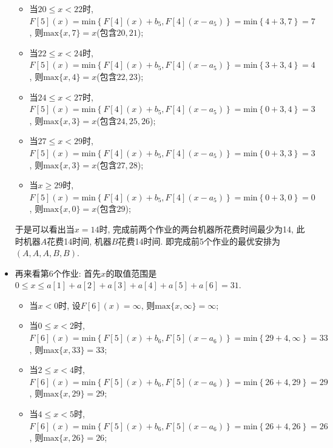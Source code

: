 \documentclass{article}
\begin{document}
\begin{homeworkProblem}
\begin{itemize}
\begin{itemize}
			\item 当$20\leq x<22$时, $F\left[ 5 \right] \left( x \right) =\text{min} \left\{ F\left[ 4 \right] \left( x \right) +b_5,F\left[ 4 \right] \left( x-a_5 \right) \right\} =\text{min} \left\{ 4+3,7 \right\} =7$, 则$\text{max}\{x,7\}=x$(包含$20,21$);
			\item 当$22\leq x<24$时, $F\left[ 5 \right] \left( x \right) =\text{min} \left\{ F\left[ 4 \right] \left( x \right) +b_5,F\left[ 4 \right] \left( x-a_5 \right) \right\} =\text{min} \left\{ 3+3,4 \right\} =4$, 则$\text{max}\{x,4\}=x$(包含$22,23$);
			\item 当$24\leq x<27$时, $F\left[ 5 \right] \left( x \right) =\text{min} \left\{ F\left[ 4 \right] \left( x \right) +b_5,F\left[ 4 \right] \left( x-a_5 \right) \right\} =\text{min} \left\{ 0+3,4 \right\} =3$, 则$\text{max}\{x,3\}=x$(包含$24,25,26$);
			\item 当$27\leq x<29$时, $F\left[ 5 \right] \left( x \right) =\text{min} \left\{ F\left[ 4 \right] \left( x \right) +b_5,F\left[ 4 \right] \left( x-a_5 \right) \right\} =\text{min} \left\{ 0+3,3 \right\} =3$, 则$\text{max}\{x,3\}=x$(包含$27,28$);
			\item 当$x\geq 29$时, $F\left[ 5 \right] \left( x \right) =\text{min} \left\{ F\left[ 4 \right] \left( x \right) +b_5,F\left[ 4 \right] \left( x-a_5 \right) \right\} =\text{min} \left\{ 0+3,0 \right\} =0$, 则$\text{max}\{x,0\}=x$(包含$29$);
		\end{itemize}
		于是可以看出当$x=14$时, 完成前两个作业的两台机器所花费时间最少为14, 此时机器$A$花费14时间, 机器$B$花费14时间. 即完成前5个作业的最优安排为$\left( A,A,A,B,B \right) $.
		\item 再来看第6个作业: 首先$x$的取值范围是$0\leq x\leq a[1]+a[2]+a[3]+a[4]+a[5]+a[6]=31$.
		\begin{itemize}
			\item 当$x<0$时, 设$F[6](x)=\infty$, 则$\text{max}\{x,\infty\}=\infty$;
			\item 当$0\leq x < 2$时, $F\left[ 6 \right] \left( x \right) =\text{min} \left\{ F\left[ 5 \right] \left( x \right) +b_6,F\left[ 5 \right] \left( x-a_6 \right) \right\} =\text{min} \left\{ 29+4,\infty \right\} =33$, 则$\text{max}\{x,33\}=33$;
			\item 当$2\leq x<4$时, $F\left[ 6 \right] \left( x \right) =\text{min} \left\{ F\left[ 5 \right] \left( x \right) +b_6,F\left[ 5 \right] \left( x-a_6 \right) \right\} =\text{min} \left\{ 26+4,29 \right\} =29$, 则$\text{max}\{x,29\}=29$;
			\item 当$4\leq x<5$时, $F\left[ 6 \right] \left( x \right) =\text{min} \left\{ F\left[ 5 \right] \left( x \right) +b_6,F\left[ 5 \right] \left( x-a_6 \right) \right\} =\text{min} \left\{ 26+4,26 \right\} =26$, 则$\text{max}\{x,26\}=26$;

\end{itemize}
\end{itemize}
\end{homeworkProblem}
\end{document}

